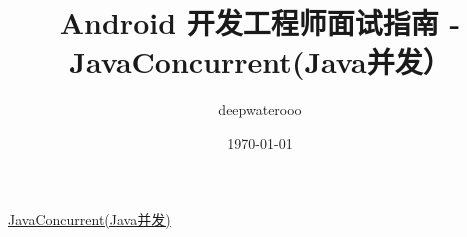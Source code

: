 \documentclass[12pt]{book}
\author{deepwaterooo}
\date{\today}
\title{Android 开发工程师面试指南 - JavaConcurrent(Java并发）}
\begin{document}
\maketitle
\tableofcontents

\href{file://e:/Android_Java_Developer/part2.org}{JavaConcurrent(Java并发)}
\end{document}
